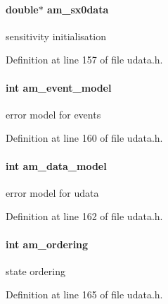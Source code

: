 \paragraph[{am\+\_\+sx0data}]{\setlength{\rightskip}{0pt plus 5cm}double$\ast$ am\+\_\+sx0data}\label{struct_user_data_a7ac27602345668b3a2bcabac4c7af733}
sensitivity initialisation 

Definition at line 157 of file udata.\+h.

\hypertarget{struct_user_data_ace3cae0f78a3365a5fac7d7daa9928ff}{}
\paragraph[{am\+\_\+event\+\_\+model}]{\setlength{\rightskip}{0pt plus 5cm}int am\+\_\+event\+\_\+model}\label{struct_user_data_ace3cae0f78a3365a5fac7d7daa9928ff}
error model for events 

Definition at line 160 of file udata.\+h.

\hypertarget{struct_user_data_a83373144a2adb9f97cdfca2dfc79ce80}{}
\paragraph[{am\+\_\+data\+\_\+model}]{\setlength{\rightskip}{0pt plus 5cm}int am\+\_\+data\+\_\+model}\label{struct_user_data_a83373144a2adb9f97cdfca2dfc79ce80}
error model for udata 

Definition at line 162 of file udata.\+h.

\hypertarget{struct_user_data_a260a14e35469f1516b194f4f065a9794}{}
\paragraph[{am\+\_\+ordering}]{\setlength{\rightskip}{0pt plus 5cm}int am\+\_\+ordering}\label{struct_user_data_a260a14e35469f1516b194f4f065a9794}
state ordering 

Definition at line 165 of file udata.\+h.

